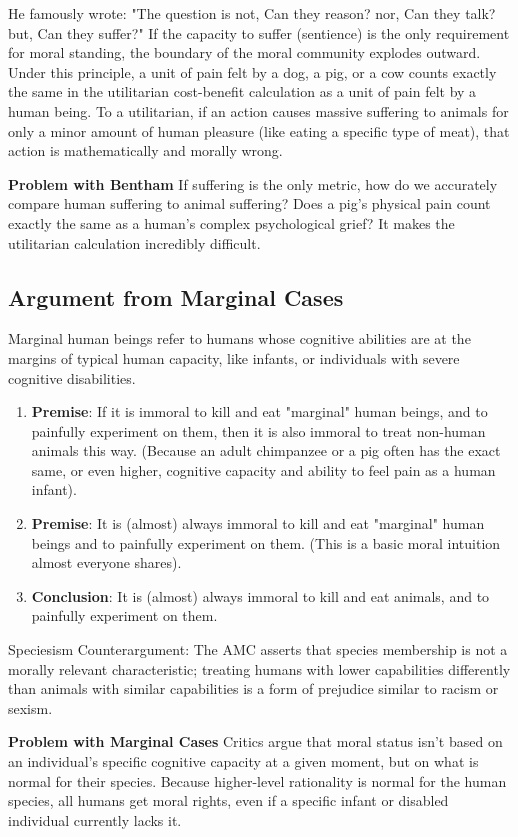 \documentclass[12pt]{article}
\begin{document}
\noindent He famously wrote: "The question is not, Can they reason? nor, Can they talk? but, Can they suffer?"
If the capacity to suffer (sentience) is the only requirement for moral standing, the boundary of the moral community explodes outward.
Under this principle, a unit of pain felt by a dog, a pig, or a cow counts exactly the same in the utilitarian cost-benefit calculation as a unit of pain felt by a human being.
To a utilitarian, if an action causes massive suffering to animals for only a minor amount of human pleasure (like eating a specific type of meat), that action is mathematically and morally wrong.

\noindent\textbf{Problem with Bentham}
If suffering is the only metric, how do we accurately compare human suffering to animal suffering?
Does a pig's physical pain count exactly the same as a human's complex psychological grief?
It makes the utilitarian calculation incredibly difficult.

\subsection{Argument from Marginal Cases}
Marginal human beings refer to humans whose cognitive abilities are at the margins of typical human capacity, like infants, or individuals with severe cognitive disabilities.
\begin{enumerate}
    \item \textbf{Premise}: If it is immoral to kill and eat "marginal" human beings, and to painfully experiment on them, then it is also immoral to treat non-human animals this way. (Because an adult chimpanzee or a pig often has the exact same, or even higher, cognitive capacity and ability to feel pain as a human infant).
    \item \textbf{Premise}: It is (almost) always immoral to kill and eat "marginal" human beings and to painfully experiment on them. (This is a basic moral intuition almost everyone shares).
    \item \textbf{Conclusion}: It is (almost) always immoral to kill and eat animals, and to painfully experiment on them.
\end{enumerate}
Speciesism Counterargument: The AMC asserts that species membership is not a morally relevant characteristic; treating humans with lower capabilities differently than animals with similar capabilities is a form of prejudice similar to racism or sexism.

\noindent\textbf{Problem with Marginal Cases}
Critics argue that moral status isn't based on an individual's specific cognitive capacity at a given moment, but on what is normal for their species.
Because higher-level rationality is normal for the human species, all humans get moral rights, even if a specific infant or disabled individual currently lacks it.
\end{document}
